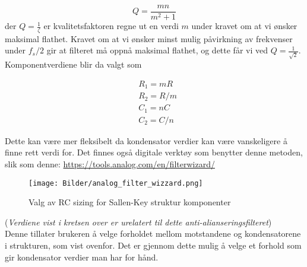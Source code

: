 \[
    Q = \frac{mn}{m^2 + 1}
\]
der $Q = \frac{1}{\zeta}$ er kvalitetsfaktoren regne ut en verdi $m$ under kravet om at vi ønsker maksimal flathet.
Kravet om at vi ønsker minst mulig påvirkning av frekvenser under $f_s/2$ gir at filteret må oppnå maksimal flathet,
og dette får vi ved $Q = \frac{1}{\sqrt{2}}$. Komponentverdiene blir da valgt som

\begin{align*}
    &R_1 = mR \\
    &R_2 = R/m \\
    &C_1 = nC   \\
    &C_2 = C/n
\end{align*}

Dette kan være mer fleksibelt da kondensator verdier kan være vanskeligere å finne rett verdi for. Det finnes også digitale 
verktøy som benytter denne metoden, slik som denne: \url{https://tools.analog.com/en/filterwizard/}
\begin{figure}[H]
    \centering
    \texttt{[image: Bilder/analog\_filter\_wizzard.png]}
    \caption{Valg av RC sizing for Sallen-Key struktur komponenter}
    \label{analog-wizzard}
\end{figure}
(\textit{Verdiene vist i kretsen over er urelatert til dette anti-alianseringsfilteret})\\
Denne tillater brukeren å velge forholdet mellom motstandene og kondensatorene i strukturen, som vist ovenfor. Det er gjennom 
dette mulig å velge et forhold som gir kondensator verdier man har for hånd.

